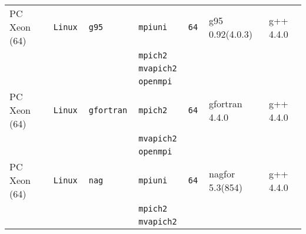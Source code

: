 \begin{tabular}{lllllll}
PC Xeon (64)          &\tt Linux  &\tt g95          &\tt mpiuni     &\tt 64              & g95 \footnotesize 0.92(4.0.3)      & g++  \footnotesize 4.4.0        \\ %
                      &           &                 &\tt mpich2     &                    &                                    &                                 \\
                      &           &                 &\tt mvapich2   &                    &                                    &                                 \\
                      &           &                 &\tt openmpi    &                    &                                    &                                 \\
PC Xeon (64)          &\tt Linux  &\tt gfortran     &\tt mpich2     &\tt 64              & gfortran \footnotesize 4.4.0       & g++  \footnotesize 4.4.0        \\ %
                      &           &                 &\tt mvapich2   &                    &                                    &                                 \\
                      &           &                 &\tt openmpi    &                    &                                    &                                 \\
PC Xeon (64)          &\tt Linux  &\tt nag          &\tt mpiuni     &\tt 64              & nagfor \footnotesize 5.3(854)      & g++  \footnotesize 4.4.0        \\ %
                      &           &                 &\tt mpich2     &                    &                                    &                                 \\
                      &           &                 &\tt mvapich2   &                    &                                    &                                 \\

\end{tabular}
